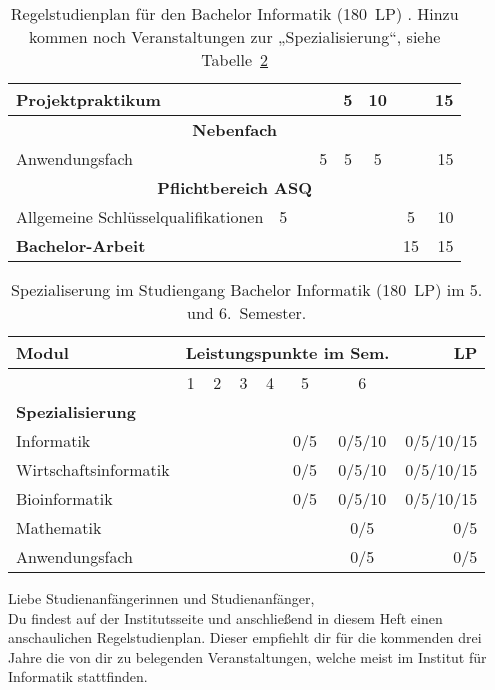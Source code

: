 \begin{table}[btp]
\begin{small}
\begin{tabularx}{\textwidth}{|X||c|c|c|c|c|c||r|}
        Projektpraktikum&&&&5&10&&15\\\hline\hline
        \multicolumn{8}{|c|}{\textbf{Nebenfach}}\\\hline
        Anwendungsfach&&&5&5&5&&15\\\hline\hline
        \multicolumn{8}{|c|}{\textbf{Pflichtbereich ASQ}}\\\hline
        Allgemeine Schlüsselqualifikationen&5&&&&&5&10\\\hline\hline
        \textbf{Bachelor-Arbeit}&&&&&&15&15\\\hline
    \end{tabularx}
    \end{small}
    \caption{Regelstudienplan für den Bachelor Informatik (180~LP)
    \label{plan-info}. Hinzu kommen noch Veranstaltungen zur „Spezialisierung“, siehe Tabelle~\ref{plan-info2}}
\end{table}

\begin{table}[!th]
    \begin{small}
    \begin{tabularx}{\textwidth}{|X||c|c|c|c|c|c||r|}
        \hline
        \textbf{Modul}&\multicolumn{6}{l||}{\textbf{Leistungspunkte im Sem.}}&\textbf{LP}\\\hline
        &1&2&3&4&5&6&\\\hline\hline
        \multicolumn{8}{|X|}{\textbf{Spezialisierung}}\\\hline
        Informatik&&&&&0/5&0/5/10&0/5/10/15\\
        Wirtschaftsinformatik&&&&&0/5&0/5/10&0/5/10/15\\
        Bioinformatik&&&&&0/5&0/5/10&0/5/10/15\\
        Mathematik&&&&&&0/5&0/5\\
        Anwendungsfach&&&&&&0/5&0/5\\\hline
    \end{tabularx}
    \end{small}
    \caption{Spezialiserung im Studiengang Bachelor Informatik (180~LP) im 5. und 6.~Semester. \label{plan-info2}}
\end{table}

Liebe Studienanfängerinnen und Studienanfänger,\\
Du findest auf der Institutsseite und anschließend in diesem Heft einen anschaulichen Regelstudienplan.
Dieser empfiehlt dir für die kommenden drei Jahre die von dir zu belegenden Veranstaltungen, welche meist im Institut für Informatik stattfinden.

